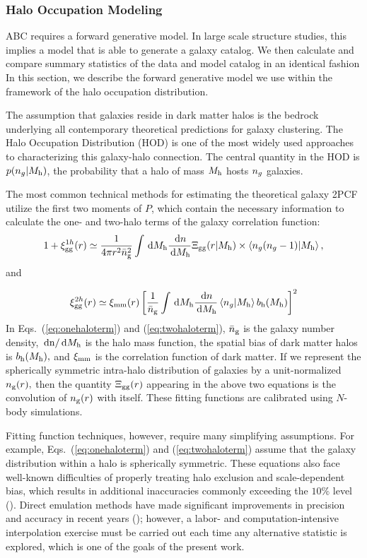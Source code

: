 \subsubsection{Halo Occupation Modeling}


ABC requires a forward generative model. In large scale structure studies, this implies a model
that is able to generate a galaxy catalog. We then calculate and compare summary statistics of the data and model catalog in an identical fashion
In this section, we describe the forward generative model we use within the framework of the 
halo occupation distribution.

The assumption that galaxies reside in dark matter halos is the bedrock underlying 
all contemporary theoretical predictions for galaxy clustering. The Halo Occupation Distribution 
(HOD) is one of the most widely used approaches to characterizing this galaxy-halo connection. 
The central quantity in the HOD is $p(n_{g}|M_{\rm h})$, the probability that a halo of mass 
$M_{\rm h}$ hosts $n_{g}$ galaxies. 

The most common technical methods for estimating the theoretical galaxy 2PCF utilize the 
first two moments of $P$, which contain the necessary information to calculate the one- 
and two-halo terms of the galaxy correlation function:
\begin{eqnarray}
\label{eq:onehaloterm}
1+\xi^{1h}_{\mathrm{gg}}(r) \simeq \frac{1}{4\pi{}r^{2}\bar{n}_{\mathrm{g}}^{2}}\int\,\mathrm{d}M_{\rm h}\frac{\,\mathrm{d} n}{\,\mathrm{d}M_{\rm h}}\Xi_{\rm gg}(r|M_{\rm h}) \times \left\langle n_{g}(n_{g}-1) \vert {M_{\rm h}}\right\rangle,
\end{eqnarray} and

\begin{eqnarray}
\label{eq:twohaloterm}
\xi^{2h}_{\mathrm{gg}}(r) \simeq \xi_{\mathrm{mm}}(r)\left[\frac{1}{\bar{n}_{\mathrm{g}}}\int\,\mathrm{d}M_{\rm h}\frac{\,\mathrm{d} n}{\,\mathrm{d}M_{\rm h}} \left\langle n_{g} \vert {M_{\rm h}}\right\rangle b_{\mathrm{h}}(M_{\rm h})\right]^{2}
\end{eqnarray}
In Eqs.~(\ref{eq:onehaloterm}) and (\ref{eq:twohaloterm}), $\bar{n}_{\mathrm{g}}$ is the galaxy number density,
$\,\mathrm{d}\mathrm{n}/\,\mathrm{d}M_{\rm h}$ is the halo mass function, the spatial bias of dark matter halos is 
$b_{\mathrm{h}}(M_{\rm h}),$ and $\xi_{\rm mm}$ is the correlation function of dark matter.  
If we represent the spherically symmetric intra-halo distribution of galaxies by a unit-normalized 
$n_{\rm g}(r),$ then the quantity $\Xi_{\rm gg}(r)$ appearing in the above two equations 
is the convolution of $n_{\rm g}(r)$ with itself. These fitting functions are calibrated using $N$-body 
simulations. 

Fitting function techniques, however, require many simplifying assumptions. For example, 
Eqs.~(\ref{eq:onehaloterm}) and (\ref{eq:twohaloterm}) assume that the galaxy 
distribution within a halo is spherically symmetric. These equations 
also face well-known difficulties of properly treating halo exclusion and scale-dependent bias, 
which results in additional inaccuracies commonly exceeding the $10\%$ level (\citealt{vdb13}). 
Direct emulation methods have made significant improvements in precision and accuracy in recent 
years (\citealt{coyote2,coyote1}); however, a labor- and computation-intensive interpolation 
exercise must be carried out each time any alternative statistic is explored, which is one of the goals of the present work.

